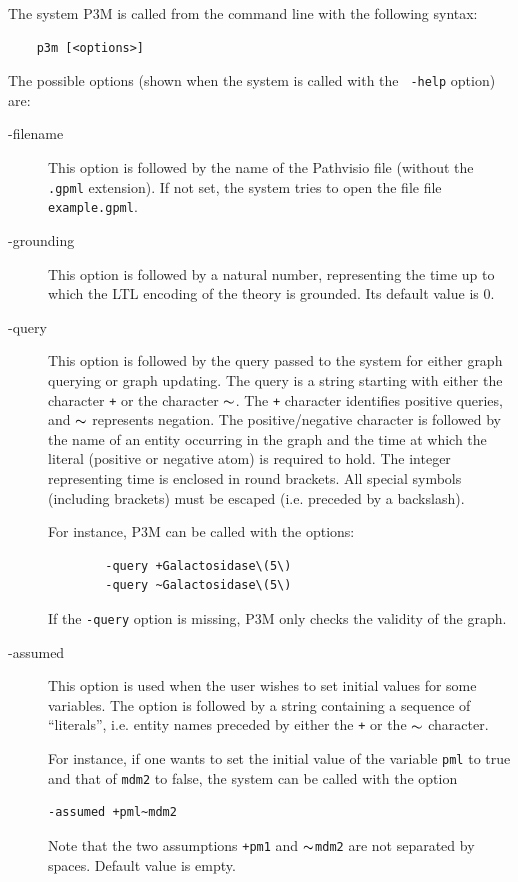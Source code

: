 \documentclass[a4paper]{article}
\begin{document}
The system P3M is called from the command line with the following syntax:
\begin{verbatim}
    p3m [<options>] 
\end{verbatim}
The possible options (shown when the system is called with the {\tt
  -help} option) are:
\begin{description}
\item[-filename] This option is followed by the name of 
 the Pathvisio file (without the {\tt
  .gpml} extension). If not set, the system tries to open the file 
file {\tt example.gpml}.
 \item[-grounding] This option is followed by a natural number,
   representing the time up to which the LTL encoding of the theory is
   grounded. Its default value is $0$.
\item[-query] This option is followed by the query passed to the
  system for either graph querying or graph updating. The query is a
  string starting with either the character {\tt +} or the character 
$\thicksim$. %
 The {\tt +} character identifies positive
  queries, and   $\thicksim$ %
represents negation.
The positive/negative character is 
 followed by the name of an entity
  occurring in the graph and the time at which the literal (positive
  or negative atom) is required to hold. The integer representing time
  is enclosed  in
  round brackets. All special symbols (including
  brackets) must be escaped (i.e. preceded by a backslash).

For instance, P3M can be called with the options:
\begin{verbatim}
        -query +Galactosidase\(5\) 
        -query ~Galactosidase\(5\) 
\end{verbatim}

If the {\tt -query} option is missing, P3M only checks the validity of the graph.


\item[-assumed] This option is used when the user wishes to set
  initial values for some variables. The option is followed by a
  string containing a sequence of ``literals'', i.e. entity names
  preceded by either the {\tt +} or the $\thicksim$
character. 
  
  For instance, if one wants to set the initial value of the variable
{\tt pml} to true and that of {\tt mdm2} to false, the system can be
called with the option
\begin{verbatim}
-assumed +pml~mdm2
\end{verbatim}
Note that the two assumptions {\tt +pm1} and {\tt $\thicksim$mdm2}
are not separated by spaces. Default value is empty.


\end{description}
\end{document}
